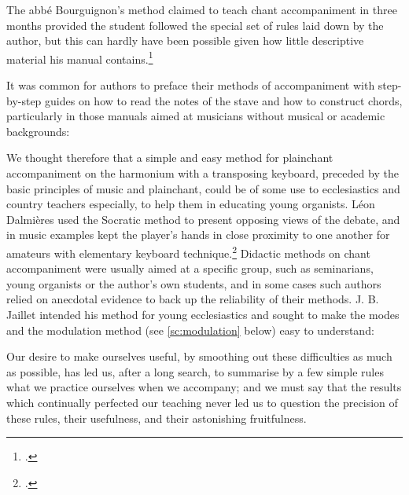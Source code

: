\pagebreak
\noindent
The abbé Bourguignon's method claimed to teach chant accompaniment in three months provided the student followed the special set of rules laid down by the author, but this can hardly have been possible given how little descriptive material his manual contains.\footcite[2, 11]{BourguignonMethodeelementaireharmonie1899}

It was common for authors to preface their methods of accompaniment with step-by-step guides on how to read the notes of the stave and how to construct chords, particularly in those manuals aimed at musicians without musical or academic backgrounds:

  {\cite[6]{BareNouvellemethodesimple1884}}
{We thought therefore that a simple and easy method for plainchant accompaniment on the harmonium with a transposing keyboard, preceded by the basic principles of music and plainchant, could be of some use to ecclesiastics and country teachers especially, to help them in educating young organists.}
\noindent
Léon Dalmières used the Socratic method to present opposing views of the debate, and in music examples kept the player's hands in close proximity to one another for amateurs with elementary keyboard technique.\footcite[5, 50--52]{DalmieresPlainchantaccompagneau1856}
Didactic methods on chant accompaniment were usually aimed at a specific group, such as seminarians, young organists or the author's own students, and in some cases such authors relied on anecdotal evidence to back up the reliability of their methods.
J. B. Jaillet intended his method for young ecclesiastics and sought to make the modes and the modulation method (see \cref{sc:modulation} below) easy to understand:
\pagebreak{}

  {\cite[p. v]{JailletMethodenouvellepour1857}}
{Our desire to make ourselves useful, by smoothing out these difficulties as much as possible, has led us, after a long search, to summarise by a few simple rules what we practice ourselves when we accompany; and we must say that the results which continually perfected our teaching never led us to question the precision of these rules, their usefulness, and their astonishing fruitfulness.}

